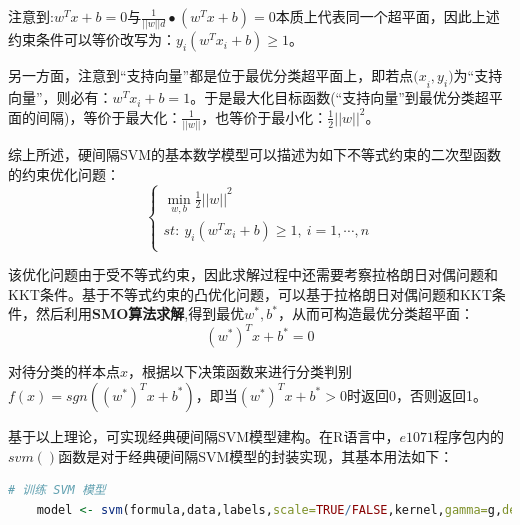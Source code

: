 \documentclass[12pt]{article}  %
\begin{document}
注意到:$w^Tx+b=0$与$\frac{1}{||w||d}\bullet(w^Tx+b)=0$本质上代表同一个超平面，因此上述约束条件可以等价改写为：$y_i(w^Tx_i+b)\geq1$。

另一方面，注意到“支持向量”都是位于最优分类超平面上，即若点${(x}_i,y_i)$为“支持向量”，则必有：$w^Tx_i+b=1$。于是最大化目标函数(“支持向量”到最优分类超平面的间隔)，等价于最大化：$\frac{1}{||w||}$，也等价于最小化：$\frac{1}{2}{||w||}^2$。

综上所述，硬间隔SVM的基本数学模型可以描述为如下不等式约束的二次型函数的约束优化问题：
\begin{equation}
	\begin{cases}
		\mathop{min}\limits_{w,b}{{\frac{1}{2}||w||}^{2}}\\                                                   
		st:\ y_i(w^Tx_i+b)\geq1,\ i=1,\cdots,n \\
	\end{cases}
\end{equation}

该优化问题由于受不等式约束，因此求解过程中还需要考察拉格朗日对偶问题和KKT条件。基于不等式约束的凸优化问题，可以基于拉格朗日对偶问题和KKT条件，然后利用\textbf{SMO算法求解},得到最优$w^\ast,b^\ast$，从而可构造最优分类超平面：
\begin{equation}
	{(w^\ast)}^Tx+b^\ast=0
\end{equation}

对待分类的样本点$x$，根据以下决策函数来进行分类判别$f(x)=sgn({(w^\ast)}^Tx+b^\ast)$，即当${(w^\ast)}^Tx+b^\ast>0$时返回0，否则返回1。

基于以上理论，可实现经典硬间隔SVM模型建构。在R语言中，$e1071$程序包内的$svm()$函数是对于经典硬间隔SVM模型的封装实现，其基本用法如下：

\begin{lstlisting}[language=R]
	# 训练 SVM 模型
	model <- svm(formula,data,labels,scale=TRUE/FALSE,kernel,gamma=g,degree=d,cost=C,epsilon=0.1,na.action=na.omit/na.fail)
\end{lstlisting}
\end{document}
